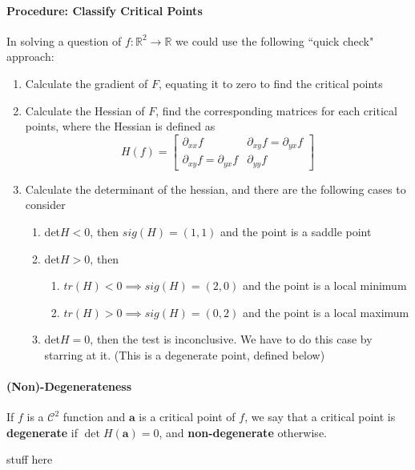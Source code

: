 \documentclass[11pt]{article}
\newcommand{\real}{\mathbb{R}}
\newcommand{\va}{\mathbf{a}}
\begin{document}
\paragraph{Procedure: Classify Critical Points}
In solving a question of $f:\real^2 \rightarrow{} \real$ we could use the following ``quick check" approach:
\begin{enumerate}
    \item Calculate the gradient of $F$, equating it to zero to find the critical points
    \item Calculate the Hessian of $F$, find the corresponding matrices for each critical points, where the Hessian is defined as
    \begin{equation*} H(f) =
        \begin{bmatrix}
             \partial_{xx}f & \partial_{xy}f = \partial_{yx}f \\
             \partial_{xy}f = \partial_{yx}f & \partial_{yy}f
        \end{bmatrix}
    \end{equation*}
    \item Calculate the determinant of the hessian, and there are the following cases to consider
    \begin{enumerate}
        \item det$H<0$, then $sig(H) = (1,1)$ and the point is a saddle point
        \item det$H>0$, then
            \begin{enumerate}
                \item $tr(H)<0 \implies sig(H) = (2,0)$ and the point is a local minimum
                \item $tr(H)>0 \implies sig(H) = (0,2)$ and the point is a local maximum
            \end{enumerate}
        \item det$H=0$, then the test is inconclusive. We have to do this case by starring at it. (This is a degenerate point, defined below)
    \end{enumerate}
\end{enumerate}

\paragraph{(Non)-Degenerateness} If $f$ is a $\mathcal{C}^2$ function and $\va$ is a critical point of $f$, we say that a critical point is \textbf{degenerate} if $\det H(\va) = 0$, and \textbf{non-degenerate} otherwise.

stuff here
\end{document}
